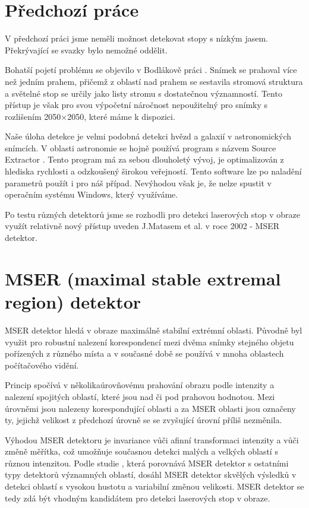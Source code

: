 \section{Předchozí práce}

V předchozí práci \cite{Drapela} jsme neměli možnost detekovat stopy s nízkým jasem. Překrývající se svazky bylo nemožné oddělit.  

Bohatší pojetí problému se objevilo v Bodlákově práci \cite{Bodlak2005}. Snímek se prahoval více než jedním prahem, přičemž z oblastí nad prahem se sestavila stromová struktura a světelné stop se určily jako listy stromu s dostatečnou významností. Tento přístup je však pro svou výpočetní náročnost nepoužitelný pro snímky s rozlišením 2050$\times$2050, které máme k dispozici. 

Naše úloha detekce je velmi podobná detekci hvězd a galaxií v astronomických snímcích. V oblasti astronomie se hojně používá program s názvem Source Extractor \cite{SEXarticle}. Tento program má za sebou dlouholetý vývoj, je optimalizován z hlediska rychlosti a odzkoušený širokou veřejností. Tento software lze po naladění parametrů použít i pro náš případ. Nevýhodou však je, že nelze spustit v operačním systému Windows, který využíváme.  

Po testu různých detektorů jsme se rozhodli pro detekci laserových stop v obraze využít relativně nový přístup uveden J.Matasem et al. \cite{Matas} v roce 2002 - MSER detektor. 




\section{MSER (maximal stable extremal region) detektor}

MSER detektor hledá v obraze maximálně stabilní extrémní oblasti. Původně byl využit pro robustní nalezení korespondencí mezi dvěma snímky stejného objetu pořízených z různého místa a v současné době se používá v mnoha oblastech počítačového vidění.  

Princip spočívá v několikaúrovňovému prahování obrazu podle intenzity a nalezení spojitých oblastí, které jsou nad či pod prahovou hodnotou. Mezi úrovněmi jsou nalezeny korespondující oblasti a za MSER oblasti jsou označeny ty, jejichž velikost z předchozí úrovně se se zvyšující úrovní příliš nezměnila. 

Výhodou MSER detektoru je invariance vůči afinní transformaci intenzity a vůči změně měřítka, což umožňuje současnou detekci malých a velkých oblastí s různou intenzitou. Podle studie \cite{Comparison}, která porovnává MSER detektor s ostatními typy detektorů významných oblastí, dosáhl MSER detektor skvělých výsledků v detekci oblastí s vysokou hustotu a variabilní změnou velikosti. MSER detektor se tedy zdá být vhodným kandidátem pro detekci laserových stop v obraze.


